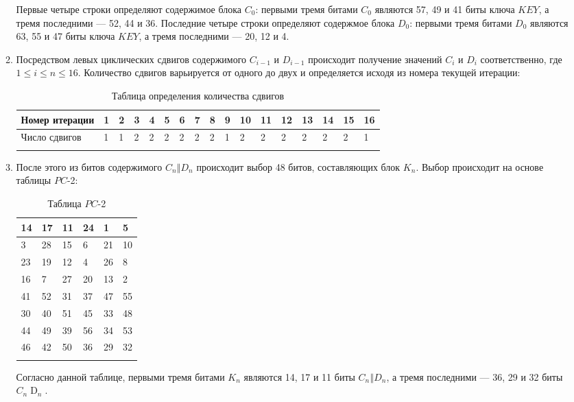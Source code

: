 \documentclass{./civarticle}
\begin{document}
\begin{itemize}
\begin{enumerate}
Первые четыре строки определяют содержимое блока $C_0$: первыми тремя битами $C_0$ являются 57, 49 и 41 биты ключа $KEY$, а тремя последними --- 52, 44 и 36. Последние четыре строки определяют содержмое блока $D_0$: первыми тремя битами $D_0$ являются 63, 55 и 47 биты ключа $KEY$, а тремя последними --- 20, 12 и 4. 

\item Посредством левых циклических сдвигов содержимого $C_{i-1}$ и $D_{i-1}$ происходит получение значений $C_i$ и $D_i$ соответственно, где $1 \leq i \leq n \leq 16$. Количество сдвигов варьируется от одного до двух и определяется исходя из номера текущей итерации: 

\begin{longtable}{|p{1cm}|p{0.5cm}|p{0.5cm}|p{0.5cm}|p{0.5cm}|p{0.5cm}|p{0.5cm}|p{0.5cm}|p{0.5cm}|p{0.5cm}|p{0.5cm}|p{0.5cm}|p{0.5cm}|p{0.5cm}|p{0.5cm}|p{0.5cm}|p{0.5cm}|}
\hline
Номер итерации & 1 & 2 & 3 & 4 & 5 & 6 & 7 & 8 & 9 & 10 & 11 & 12 & 13 & 14 & 15 & 16 \\
\hline
Число сдвигов & 1 & 1 & 2 & 2 & 2 & 2 & 2 & 2 & 1 & 2 & 2 & 2 & 2 & 2 & 2 & 1 \\
\hline
\caption{Таблица определения количества сдвигов}
\end{longtable}

\item После этого из битов содержимого $C_n \mathbin\Vert D_n$ происходит выбор 48 битов, составляющих блок $K_n$. Выбор происходит на основе таблицы $PC$-2:

\begin{longtable}{|p{0.5cm}|p{0.5cm}|p{0.5cm}|p{0.5cm}|p{0.5cm}|p{0.5cm}|}
\hline
14 & 17 & 11 & 24 & 1 & 5 \\
\hline
3 & 28 & 15 & 6 & 21 & 10 \\
\hline
23 & 19 & 12 & 4 & 26 & 8 \\
\hline
16 & 7 & 27 & 20 & 13 & 2 \\
\hline
41 & 52 & 31 & 37 & 47 & 55 \\
\hline
30 & 40 & 51 & 45 & 33 & 48 \\
\hline
44 & 49 & 39 & 56 & 34 & 53 \\
\hline
46 & 42 & 50 & 36 & 29 & 32 \\
\hline
\caption{Таблица $PC$-2}
\end{longtable}

Согласно данной таблице, первыми тремя битами $K_n$ являются 14, 17 и 11 биты $C_n \mathbin\Vert D_n$, а тремя последними --- 36, 29 и 32 биты $C_n \mathbin D_n$.



\end{enumerate}
\end{itemize}
\end{document}
